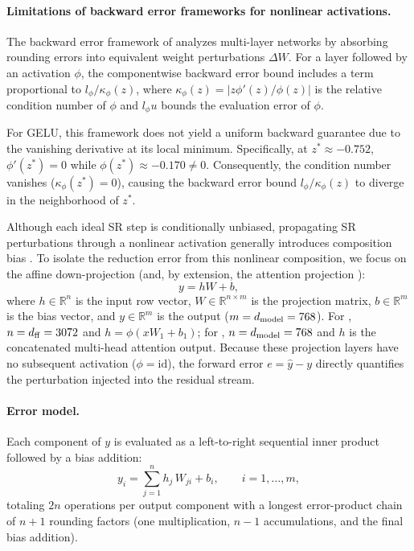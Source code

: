 \paragraph{Limitations of backward error frameworks for nonlinear activations.}
The backward error framework of \citet{beuzeville2025deterministic}
analyzes multi-layer networks by absorbing rounding errors into equivalent weight
perturbations $\Delta W$. For a layer followed by an activation $\phi$, the
componentwise backward error bound includes a term proportional to
$l_\phi / \kappa_\phi(z)$, where $\kappa_\phi(z) = |z \phi'(z) / \phi(z)|$ is the
relative condition number of $\phi$ and $l_\phi u$ bounds the evaluation error
of $\phi$.

For GELU, this framework does not yield a uniform backward guarantee due to the
vanishing derivative at its local minimum. Specifically, at $z^* \approx -0.752$,
$\phi'(z^*) = 0$ while $\phi(z^*) \approx -0.170 \neq 0$. Consequently, the
condition number vanishes ($\kappa_\phi(z^*) = 0$), causing the backward error bound
$l_\phi / \kappa_\phi(z)$ to diverge in the neighborhood of $z^*$.

Although each ideal SR step is conditionally unbiased, propagating SR perturbations
through a nonlinear activation generally introduces composition bias
\citep[Section~4]{elarar2024bounds}. To isolate the reduction error from this
nonlinear composition, we focus on the affine down-projection  (and, by extension, the attention projection ):
\begin{equation*}
  y = h W + b,
\end{equation*}
where $h \in \mathbb{R}^n$ is the input row vector, $W \in \mathbb{R}^{n \times m}$ is the projection matrix,
$b \in \mathbb{R}^m$ is the bias vector, and $y \in \mathbb{R}^m$ is the output ($m = d_{\rm model} = 768$).
For , $n = d_{\rm ff} = 3072$ and $h = \phi(x W_1 + b_1)$; for , $n = d_{\rm model} = 768$ and $h$ is the concatenated multi-head attention output.
Because these projection layers have no subsequent activation ($\phi = \mathrm{id}$), the forward
error $e = \hat{y} - y$ directly quantifies the perturbation injected into the
residual stream.

\paragraph{Error model.}
Each component of $y$ is evaluated as a left-to-right sequential inner product
followed by a bias addition:
\begin{equation*}
  y_i = \sum_{j=1}^{n} h_j \, W_{ji} + b_i, \qquad i = 1, \dots, m,
\end{equation*}
totaling $2n$ operations per output component with a longest error-product chain
of $n + 1$ rounding factors (one multiplication, $n - 1$ accumulations, and the
final bias addition).

